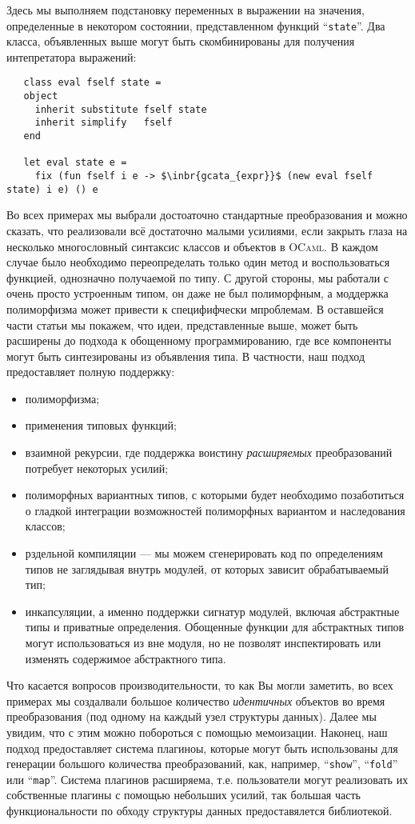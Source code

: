 Здесь мы выполняем подстановку переменных в выражении на значения, определенные в некотором состоянии, представленном функций ``\lstinline{state}''. Два класса, объявленных выше могут быть скомбинированы для получения интепретатора выражений:

\begin{lstlisting}
   class eval fself state =
   object
     inherit substitute fself state
     inherit simplify   fself
   end

   let eval state e =
     fix (fun fself i e -> $\inbr{gcata_{expr}}$ (new eval fself state) i e) () e  
\end{lstlisting}

Во всех примерах мы выбрали достоаточно стандартные преобразования и можно сказать, что реализовали всё достаточно малыми усилиями,
если закрыть глаза на несколько многословный синтаксис классов и объектов в  \textsc{OCaml}. В каждом случае было необходимо переопределать
только один метод и воспользоваться функцией, однозначно получаемой по типу. 
С другой стороны, мы работали с очень просто устроенным типом, он даже не был полиморфным, а моддержка полиморфизма может привести к 
специфифчески мпроблемам. В оставшейся части статьи мы покажем, что идеи, представленные выше, может быть расширены до подхода к обощенному программированию, где все компоненты могут быть синтезированы из объявления типа. В частности, наш подход предоставляет полную поддержку:

\begin{itemize}
\item полиморфизма;
\item применения типовых функций;
\item взаимной рекурсии, где поддержка воистину \emph{расширяемых} преобразований потребует некоторых усилий;
\item полиморфных вариантных типов, с которыми будет необходимо позаботиться о гладкой интеграции возможностей полиморфных вариантом и наследования классов;
\item рздельной компиляции --- мы можем сгенерировать код по определениям типов не заглядывая внутрь модулей, от которых зависит обрабатываемый тип;
\item инкапсуляции, а именно поддержки сигнатур модулей, включая абстрактные типы и приватные определения. Обощенные функции для абстрактных типов могут использоваться из вне модуля, но не позволят инспектировать или изменять содержимое абстрактного типа.
\end{itemize}

Что касается вопросов производительности, то как Вы могли заметить, во всех примерах мы создалвали большое количество 
\emph{идентичных} объектов во время преобразования (под одному на каждый узел структуры данных). Далее мы увидим, что с этим можно побороться
с помощью мемоизации. Наконец, наш подход предоставляет система плагиноы, которые могут быть использованы для генерации большого количества преобразований, как, например, ``\lstinline{show}'', ``\lstinline{fold}'' или ``\lstinline{map}''. Система плагинов расширяема, т.е. пользователи могут  реализовать их собственные плагины с помощью небольших усилий, так большая часть функциональности по обходу структуры данных предоставялется библиотекой. 

